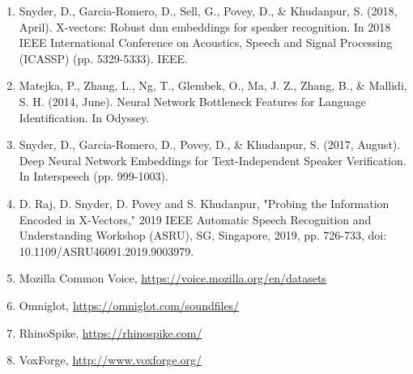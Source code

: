 \documentclass{llncs}
\begin{document}
\begin{enumerate}
\item Snyder, D., Garcia-Romero, D., Sell, G., Povey, D., \& Khudanpur, S. (2018, April). X-vectors: Robust dnn embeddings for speaker recognition. In 2018 IEEE International Conference on Acoustics, Speech and Signal Processing (ICASSP) (pp. 5329-5333). IEEE.

\item Matejka, P., Zhang, L., Ng, T., Glembek, O., Ma, J. Z., Zhang, B., \& Mallidi, S. H. (2014, June). Neural Network Bottleneck Features for Language Identification. In Odyssey.

\item Snyder, D., Garcia-Romero, D., Povey, D., \& Khudanpur, S. (2017, August). Deep Neural Network Embeddings for Text-Independent Speaker Verification. In Interspeech (pp. 999-1003).

\item D. Raj, D. Snyder, D. Povey and S. Khudanpur, "Probing the Information Encoded in X-Vectors," 2019 IEEE Automatic Speech Recognition and Understanding Workshop (ASRU), SG, Singapore, 2019, pp. 726-733, doi: 10.1109/ASRU46091.2019.9003979.

\item Mozilla Common Voice, \url{https://voice.mozilla.org/en/datasets}

\item Omniglot, \url{https://omniglot.com/soundfiles/}

\item RhinoSpike, \url{https://rhinospike.com/}

\item VoxForge, \url{http://www.voxforge.org/}
\end{enumerate}
\end{document}
